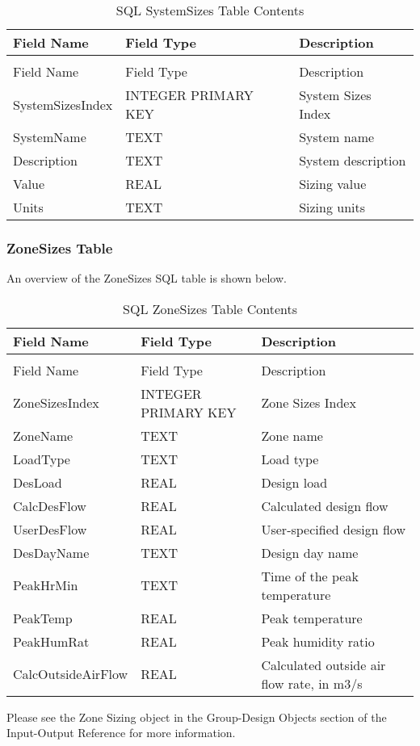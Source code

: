 \begin{longtable}[c]{@{}lll@{}}
\caption{SQL SystemSizes Table Contents \label{table:table-31.-sql-systemsizes-table-contents}} \tabularnewline
\toprule 
Field Name & Field Type & Description \tabularnewline
\midrule
\endfirsthead

\caption[]{SQL SystemSizes Table Contents} \tabularnewline
\toprule 
Field Name & Field Type & Description \tabularnewline
\midrule
\endhead

SystemSizesIndex & INTEGER PRIMARY KEY & System Sizes Index \tabularnewline
SystemName & TEXT & System name \tabularnewline
Description & TEXT & System description \tabularnewline
Value & REAL & Sizing value \tabularnewline
Units & TEXT & Sizing units \tabularnewline
\bottomrule
\end{longtable}

\subsubsection{ZoneSizes Table}

An overview of the ZoneSizes SQL table is shown below.

\begin{longtable}[c]{p{1.5in}p{1.5in}p{2.99in}}
\caption{SQL ZoneSizes Table Contents \label{table:table-32.-sql-zonesizes-table-contents}} \tabularnewline
\toprule 
Field Name & Field Type & Description \tabularnewline
\midrule
\endfirsthead

\caption[]{SQL ZoneSizes Table Contents} \tabularnewline
\toprule 
Field Name & Field Type & Description \tabularnewline
\midrule
\endhead

ZoneSizesIndex & INTEGER PRIMARY KEY & Zone Sizes Index \tabularnewline
ZoneName & TEXT & Zone name \tabularnewline
LoadType & TEXT & Load type \tabularnewline
DesLoad & REAL & Design load \tabularnewline
CalcDesFlow & REAL & Calculated design flow \tabularnewline
UserDesFlow & REAL & User-specified design flow \tabularnewline
DesDayName & TEXT & Design day name \tabularnewline
PeakHrMin & TEXT & Time of the peak temperature \tabularnewline
PeakTemp & REAL & Peak temperature \tabularnewline
PeakHumRat & REAL & Peak humidity ratio \tabularnewline
CalcOutsideAirFlow & REAL & Calculated outside air flow rate, in m3/s \tabularnewline
\bottomrule
\end{longtable}

Please see the Zone Sizing object in the Group-Design Objects section of the Input-Output Reference for more information.

